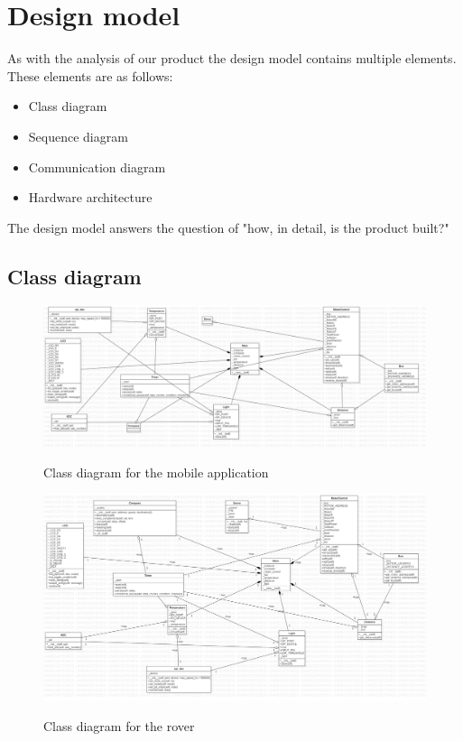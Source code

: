 \documentclass[12pt]{article}
\begin{document}
 	\section{Design model}
 	As with the analysis of our product the design model contains multiple elements. These elements are as follows:
 	\begin{itemize}
 		\item Class diagram
 		\item Sequence diagram
 		\item Communication diagram
 		\item Hardware architecture
 	\end{itemize}
 	The design model answers the question of "how, in detail, is the product built?"
 	\subsection{Class diagram}
 		\begin{figure}[H]
 		\centering
 		\includegraphics[width=\linewidth]{MobileClassDiagram.png}\\
 		\caption{Class diagram for the mobile application}
 		\end{figure}
	 	\begin{figure}[H]
	 		\centering
	 		\includegraphics[width=\linewidth]{MainClassDiagram.png}\\
	 		\caption{Class diagram for the rover}
	 	\end{figure}
\end{document}
